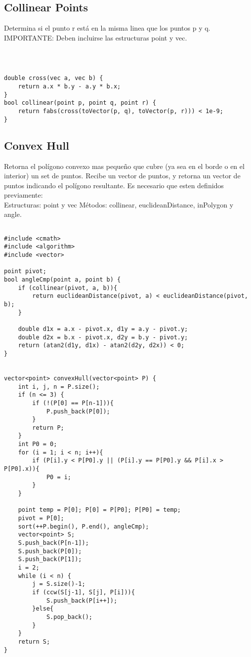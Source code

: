 \documentclass[11pt,letterpaper,twocolumn,twosided]{article}
\begin{document}
\subsection{Collinear Points}
Determina si el punto r est\'a en la misma linea que los puntos p y q. IMPORTANTE: Deben incluirse las estructuras point y vec.

\begin{lstlisting}



double cross(vec a, vec b) { 
	return a.x * b.y - a.y * b.x; 
}
bool collinear(point p, point q, point r) {
	return fabs(cross(toVector(p, q), toVector(p, r))) < 1e-9; 
}
\end{lstlisting}

\subsection{Convex Hull}
Retorna el pol\'igono convexo mas peque\~no que cubre (ya sea en el borde o en el interior) un set de puntos. Recibe un vector de puntos, y retorna un vector de puntos indicando el pol\'igono resultante. Es necesario que esten definidos previamente: \\
Estructuras: point y vec
M\'etodos: collinear, euclideanDistance, inPolygon y angle.

\begin{lstlisting}

#include <cmath>
#include <algorithm>
#include <vector>

point pivot;
bool angleCmp(point a, point b) {                
	if (collinear(pivot, a, b)){
		return euclideanDistance(pivot, a) < euclideanDistance(pivot, b);
	}                              
        
  	double d1x = a.x - pivot.x, d1y = a.y - pivot.y;
  	double d2x = b.x - pivot.x, d2y = b.y - pivot.y;
  	return (atan2(d1y, d1x) - atan2(d2y, d2x)) < 0; 
}


vector<point> convexHull(vector<point> P) {  
  	int i, j, n = P.size();
  	if (n <= 3) {
    	if (!(P[0] == P[n-1])){
    		P.push_back(P[0]);
    	}  
    	return P;
  	}
  	int P0 = 0;
  	for (i = 1; i < n; i++){
  		if (P[i].y < P[P0].y || (P[i].y == P[P0].y && P[i].x > P[P0].x)){
  	 		P0 = i;
  	 	}
  	}

  	point temp = P[0]; P[0] = P[P0]; P[P0] = temp; 
	pivot = P[0];
  	sort(++P.begin(), P.end(), angleCmp);     
	vector<point> S;
  	S.push_back(P[n-1]); 
  	S.push_back(P[0]); 
  	S.push_back(P[1]);    
  	i = 2;                                         
  	while (i < n) {           
    	j = S.size()-1;
    	if (ccw(S[j-1], S[j], P[i])){
    		S.push_back(P[i++]);
    	}else{
    		S.pop_back();
    	}  
    }  
  	return S; 
}  
\end{lstlisting}
\end{document}
